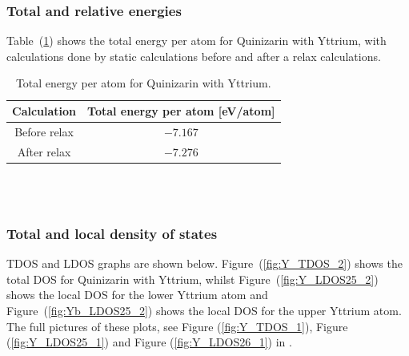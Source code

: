 \documentclass{article}
\begin{document}
      \vspace{1cm}

    \subsubsection{Total and relative energies}

      Table~(\ref{tab:TOTENY}) shows the total energy per atom for Quinizarin with Yttrium, with calculations done by static calculations before and after a relax calculations. \\

      \begin{table}[H]
        \centering
        \caption{Total energy per atom for Quinizarin with Yttrium. }
        \vspace{0mm}
        \label{tab:TOTENY}
        \begin{tabular}{|c|c|}
            \hline
            Calculation & Total energy per atom [eV/atom]  \\
            \hline \hline
            Before relax & $-7.167$ \\
            After relax & $-7.276$ \\
            \hline
        \end{tabular} \\
        \hspace{0pt}\\
      \end{table}

      \vspace{1cm}

    \subsubsection{Total and local density of states}

      TDOS and LDOS graphs are shown below. Figure~(\ref{fig:Y_TDOS_2}) shows the total DOS for Quinizarin with Yttrium, whilst Figure~(\ref{fig:Y_LDOS25_2}) shows the local DOS for the lower Yttrium atom and Figure~(\ref{fig:Yb_LDOS25_2}) shows the local DOS for the upper Yttrium atom.
      The full pictures of these plots, see Figure (\ref{fig:Y_TDOS_1}), Figure (\ref{fig:Y_LDOS25_1}) and Figure (\ref{fig:Y_LDOS26_1}) in . \\
\end{document}

